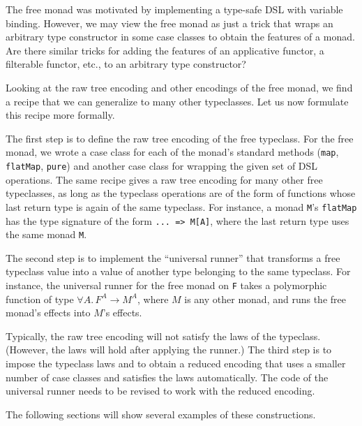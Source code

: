 The free monad was motivated by implementing a type-safe DSL with
variable binding. However, we may view the free monad as just a trick
that wraps an arbitrary type constructor in some case classes to obtain
the features of a monad. Are there similar tricks for adding the features
of an applicative functor, a filterable functor, etc., to an arbitrary
type constructor? 

Looking at the raw tree encoding and other encodings of the free monad,
we find a recipe that we can generalize to many other typeclasses.
Let us now formulate this recipe more formally.

The first step is to define the raw tree encoding of the free typeclass.
For the free monad, we wrote a case class for each of the monad\textsf{'}s
standard methods (\lstinline!map!,
\lstinline!flatMap!, \lstinline!pure!)
and another case class for wrapping the given set of DSL operations.
The same recipe gives a raw tree encoding for many other free typeclasses,
as long as the typeclass operations are of the form of functions whose
last return type is again of the same typeclass. For instance, a monad
\lstinline!M!\textsf{'}s \lstinline!flatMap!
has the type signature of the form \lstinline!... => M[A]!,
where the last return type uses the same monad \lstinline!M!.

The second step is to implement the \textsf{``}universal runner\textsf{''} that transforms
a free typeclass value into a value of another type belonging to the
same typeclass. For instance, the universal runner for the free monad
on \lstinline!F! takes
a polymorphic function of type $\forall A.\,F^{A}\rightarrow M^{A}$,
where $M$ is any other monad, and runs the free monad\textsf{'}s effects into
$M$\textsf{'}s effects.

Typically, the raw tree encoding will not satisfy the laws of the
typeclass. (However, the laws will hold after applying the runner.)
The third step is to impose the typeclass laws and to obtain a reduced
encoding that uses a smaller number of case classes and satisfies
the laws automatically. The code of the universal runner needs to
be revised to work with the reduced encoding.

The following sections will show several examples of these constructions.

